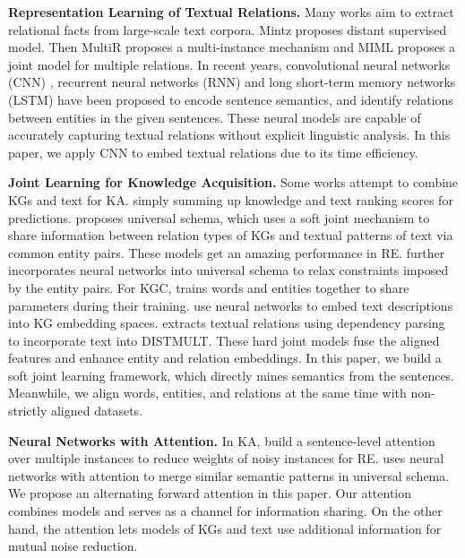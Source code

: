 \documentclass[letterpaper]{article} %
\begin{document}
\textbf{Representation Learning of Textual Relations.} Many works aim to extract relational facts from large-scale text corpora. Mintz \cite{mintz2009distant} proposes distant supervised model. Then MultiR \cite{hoffmann2011knowledge} proposes a multi-instance mechanism and MIML \cite{surdeanu2012multi} proposes a joint model for multiple relations. In recent years, convolutional neural networks (CNN) \cite{zeng2014relation,zeng2015distant}, recurrent neural networks (RNN) \cite{zhang2015relation} and long short-term memory networks (LSTM) \cite{xu2015classifying,miwa2016end} have been proposed to encode sentence semantics, and identify relations between entities in the given sentences. These neural models are capable of accurately capturing textual relations without explicit linguistic analysis. In this paper, we apply CNN to embed textual relations due to its time efficiency.

\textbf{Joint Learning for Knowledge Acquisition.} Some works attempt to combine KGs and text for KA. \cite{weston2013connecting} simply summing up knowledge and text ranking scores for predictions. \cite{riedel2013relation} proposes universal schema, which uses a soft joint mechanism to share information between relation types of KGs and textual patterns of text via common entity pairs. These models get an amazing performance in RE. \cite{vergaEtAl} further incorporates neural networks into universal schema to relax constraints imposed by the entity pairs. For KGC, \cite{wang2014knowledge} trains words and entities together to share parameters during their training. \cite{xie2016representation,wang2016text,wu2016knowledge} use neural networks to embed text descriptions into KG embedding spaces. \cite{toutanova2015representing} extracts textual relations using dependency parsing to incorporate text into DISTMULT. These hard joint models fuse the aligned features and enhance entity and relation embeddings. In this paper, we build a soft joint learning framework, which directly mines semantics from the sentences. Meanwhile, we align words, entities, and relations at the same time with non-strictly aligned datasets.

\textbf{Neural Networks with Attention.} In KA, \cite{lin2016neural,luo-EtAl:2017:Long} build a sentence-level attention over multiple instances to reduce weights of noisy instances for RE. \cite{vergamccallum} uses neural networks with attention to merge similar semantic patterns in universal schema. We propose an alternating forward attention in this paper. Our attention combines models and serves as a channel for information sharing. On the other hand, the attention lets models of KGs and text use additional information for mutual noise reduction. 
\end{document}
